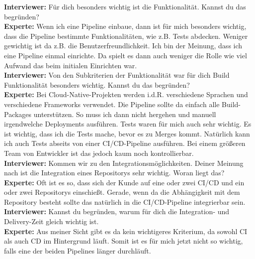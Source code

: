     \begin{center}
        \begin{figure}[H]
            \centering
            \label{fig:CEA}
        \end{figure}	
    \end{center}
    \newpage
    \resetlinenumber
    \begin{linenumbers}
        \textbf{Interviewer:} Für dich besonders wichtig ist die Funktionalität. Kannst du das begründen?\\
        \textbf{Experte:} Wenn ich eine Pipeline einbaue, dann ist für mich besonders wichtig, dass die Pipeline bestimmte Funktionalitäten, wie z.B. Tests abdecken. Weniger gewichtig ist da z.B. die Benutzerfreundlichkeit. Ich bin der Meinung, dass ich eine Pipeline einmal einrichte. Da spielt es dann auch weniger die Rolle wie viel Aufwand das beim initialen Einrichten war.\\
            \textbf{Interviewer:} Von den Subkriterien der Funktionalität war für dich Build Funktionalität besonders wichtig. Kannst du das begründen?\\
            \textbf{Experte:} Bei Cloud-Native-Projekten werden i.d.R. verschiedene Sprachen und verschiedene Frameworks verwendet. Die Pipeline sollte da einfach alle Build-Packages unterstützen. So muss ich dann nicht hergehen und manuell irgendwelche Deployments ausführen. Tests waren für mich auch sehr wichtig. Es ist wichtig, dass ich die Tests mache, bevor es zu Merges kommt. Natürlich kann ich auch Tests abseits von einer CI/CD-Pipeline ausführen. Bei einem größeren Team von Entwickler ist das jedoch kaum noch kontrollierbar.\\
            \textbf{Interviewer:} Kommen wir zu den Integrationsmöglichkeiten. Deiner Meinung nach ist die Integration eines Repositorys sehr wichtig. Woran liegt das?\\
            \textbf{Experte:} Oft ist es so, dass sich der Kunde auf eine oder zwei CI/CD und ein oder zwei Repositorys einschießt. Gerade, wenn da die Abhängigkeit mit dem Repository besteht sollte das natürlich in die CI/CD-Pipeline integrierbar sein.\\
            \textbf{Interviewer:} Kannst du begründen, warum für dich die Integration- und Delivery-Zeit gleich wichtig ist.\\
            \textbf{Experte:} Aus meiner Sicht gibt es da kein wichtigeres Kriterium, da sowohl CI als auch CD im Hintergrund läuft. Somit ist es für mich jetzt nicht so wichtig, falls eine der beiden Pipelines länger durchläuft.\\

\end{linenumbers}
